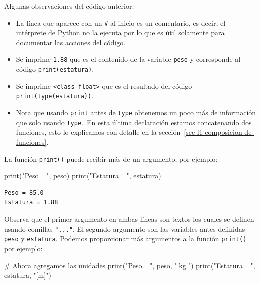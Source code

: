 \documentclass[
  spanish,
  letterpaper,
]{scrbook}
\newenvironment{Shaded}{\begin{snugshade}}{\end{snugshade}}
\newcommand{\BuiltInTok}[1]{\textcolor[rgb]{0.00,0.23,0.31}{#1}}
\newcommand{\CommentTok}[1]{\textcolor[rgb]{0.37,0.37,0.37}{#1}}
\newcommand{\NormalTok}[1]{\textcolor[rgb]{0.00,0.23,0.31}{#1}}
\newcommand{\StringTok}[1]{\textcolor[rgb]{0.13,0.47,0.30}{#1}}
\providecommand{\tightlist}{%
  \setlength{\itemsep}{0pt}\setlength{\parskip}{0pt}}
\theoremstyle{definition}
\theoremstyle{remark}
\begin{document}
Algunas observaciones del código anterior:

\begin{itemize}
\tightlist
\item
  La línea que aparece con un \texttt{\#} al inicio es un comentario, es
  decir, el intérprete de Python no la ejecuta por lo que es útil
  solamente para documentar las acciones del código.
\item
  Se imprime \texttt{1.88} que es el contenido de la variable
  \texttt{peso} y corresponde al código \texttt{print(estatura)}.
\item
  Se imprime
  \texttt{\textless{}class\ \textquotesingle{}float\textquotesingle{}\textgreater{}}
  que es el resultado del código \texttt{print(type(estatura))}.
\item
  Nota que usando \texttt{print} antes de \texttt{type} obtenemos un
  poco más de información que solo usando \texttt{type}.~En esta última
  declaración estamos concatenando dos funciones, esto lo explicamos con
  detalle en la sección~\ref{sec-l1-composicion-de-funciones}.
\end{itemize}

La función \texttt{print()} puede recibir más de un argumento, por
ejemplo:

\begin{Shaded}
\begin{Highlighting}[]
\BuiltInTok{print}\NormalTok{(}\StringTok{"Peso ="}\NormalTok{, peso)}
\BuiltInTok{print}\NormalTok{(}\StringTok{"Estatura ="}\NormalTok{, estatura)}
\end{Highlighting}
\end{Shaded}

\begin{verbatim}
Peso = 85.0
Estatura = 1.88
\end{verbatim}

Observa que el primer argumento en ambas líneas son textos los cuales se
definen usando comillas \texttt{"..."}. El segundo argumento son las
variables antes definidas \texttt{peso} y \texttt{estatura}. Podemos
proporcionar más argumentos a la función \texttt{print()} por ejemplo:~

\begin{Shaded}
\begin{Highlighting}[]
\CommentTok{\# Ahora agregamos las unidades}
\BuiltInTok{print}\NormalTok{(}\StringTok{"Peso ="}\NormalTok{, peso, }\StringTok{"[kg]"}\NormalTok{)}
\BuiltInTok{print}\NormalTok{(}\StringTok{"Estatura ="}\NormalTok{, estatura, }\StringTok{"[m]"}\NormalTok{)}
\end{Highlighting}
\end{Shaded}
\end{document}
